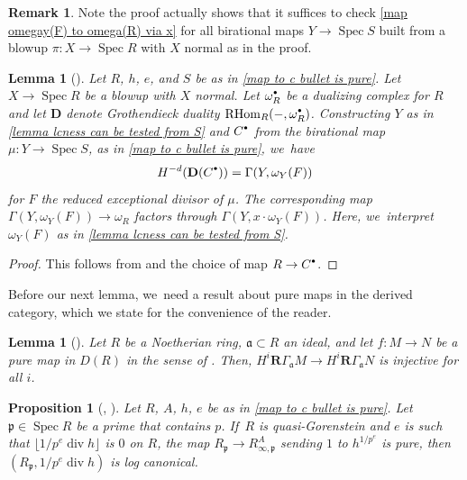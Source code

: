 \documentclass[JEP,XML,SOM,Unicode,published]{cedram}
\let\autoref\cref
\newcommand{\sbullet}{{\scriptscriptstyle\bullet}}
\newcommand{\csbullet}{{\raisebox{1pt}{$\sbullet$}}}
\theoremstyle{plain}
\newtheorem{proposition}[theorem]{Proposition}
\newtheorem{lemma}[theorem]{Lemma}
\theoremstyle{definition}
\newtheorem{remark}[theorem]{Remark}
\numberwithin{equation}{theorem}
\newcommand{\fra}{\mathfrak{a}}
\newcommand{\p}{\mathfrak{p}}
\DeclareMathOperator{\Div}{{div}}
\DeclareMathOperator{\RHom}{RHom}
\DeclareMathOperator{\Spec}{{Spec}}
\newcommand{\unpe}{{1/{p^e}}}
\begin{document}
\begin{remark}\label{rk weaker assumptions for lcness from S}
Note the proof actually shows that it suffices to check \autoref{map omegay(F) to omega(R) via x} for all birational maps $Y\to \Spec S$ built from a blowup $\pi\colon X\to \Spec R$ with $X$ normal as in the proof.
\end{remark}

\begin{lemma}[{\cf \cite[Claim\,5.5]{BMPSTWWPerfectoidPure}}]\label{bottom coh of C bullet}
Let $R$, $h$, $e$, and $S$ be as in \autoref{map to c bullet is pure}.
Let $X\to \Spec R$ be a blowup with $X$ normal. Let $\omega_R^\csbullet$ be a dualizing complex for $R$ and let $\mathbf{D}$ denote Grothendieck duality $\RHom_R(-,\omega_R^\csbullet)$.
Constructing $Y$ as in \autoref{lemma lcness can be tested from S} and $C^\csbullet$ from the birational map $\mu\colon Y\to \Spec S$, as in \autoref{map to c bullet is pure}, we~have
\[H^{-d}(\mathbf{D}(C^\csbullet))=\Gamma(Y,\omega_Y(F))\] for $F$ the reduced exceptional divisor of $\mu$.
The corresponding map $\Gamma(Y,\omega_Y(F) )\to \omega_R$ factors through $\Gamma(Y,x\cdot \omega_Y(F))$. Here, we~interpret $\omega_Y(F)$ as in \autoref{lemma lcness can be tested from S}.
\end{lemma}

\begin{proof}
This follows from \cite[Claim\,5.5]{BMPSTWWPerfectoidPure} and the choice of map $R\to C^\csbullet$.
\end{proof}

Before our next lemma, we~need a result about pure maps in the derived category, which we state for the convenience of the reader.

\begin{lemma}[{\cite[Prop.\,2.11]{BMPSTWWPerfectoidPure}}]\label{pure implies inj on coh}
Let $R$ be a Noetherian ring, $\fra\subset R$ an ideal, and let $f\colon M\to N$ be a pure map in $D(R)$ in the sense of \cite[\S 2.1]{BMPSTWWPerfectoidPure}. Then, $H^i \mathbf{R}\Gamma_\fra M\to H^i \mathbf{R}\Gamma_\fra N$ is injective for all $i$.
\end{lemma}

\begin{proposition}[{\cf \cite[Prop.\,5.4]{BMPSTWWPerfectoidPure}, \cite{KovacsSchwedeSmithLCImpliesDuBois}}]\label{lc implies log canonical p in p}
Let $R$, $A$, $h$, $e$ be as in \autoref{map to c bullet is pure}. Let $\p\in \Spec R$ be a prime that contains $p$. If~$R$ is quasi-Gorenstein and $e$ is such that $\lfloor \unpe\Div h \rfloor$ is $0$ on $R$, the map $R_\p\to R^A_{\infty,\p}$ sending $1$ to $h^\unpe$ is pure, then $(R_\p,\unpe \Div h)$ is log canonical.
\end{proposition}
\end{document}
